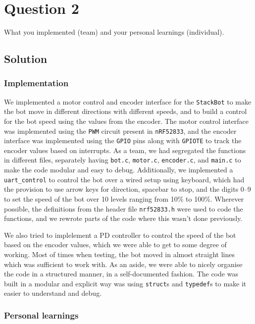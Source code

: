\section*{Question 2}

What you implemented (team) and your personal learnings (individual).

\subsection*{Solution}

\subsubsection*{Implementation}

We implemented a motor control and encoder interface for the \texttt{StackBot} to make the bot move in different directions with different speeds, and to build a control for the bot speed using the values from the encoder.
The motor control interface was implemented using the \texttt{PWM} circuit present in \texttt{nRF52833}, and the encoder interface was implemented using the \texttt{GPIO} pins along with \texttt{GPIOTE} to track the encoder values based on interrupts.
As a team, we had segregated the functions in different files, separately having \texttt{bot.c}, \texttt{motor.c}, \texttt{encoder.c}, and \texttt{main.c} to make the code modular and easy to debug.
Additionally, we implemented a \texttt{uart\_control} to control the bot over a wired setup using keyboard, which had the provision to use arrow keys for direction, spacebar to stop, and the digits 0--9 to set the speed of the bot over 10 levels ranging from 10\% to 100\%.
Wherever possible, the definitions from the header file \texttt{nrf52833.h} were used to code the functions, and we rewrote parts of the code where this wasn't done previously.

We also tried to implelement a PD controller to control the speed of the bot based on the encoder values, which we were able to get to some degree of working.
Most of times when testing, the bot moved in almost straight lines which was sufficient to work with.
As an aside, we were able to nicely organise the code in a structured manner, in a self-documented fashion.
The code was built in a modular and explicit way was using \texttt{struct}s and \texttt{typedef}s to make it easier to understand and debug.

\subsubsection*{Personal learnings}

